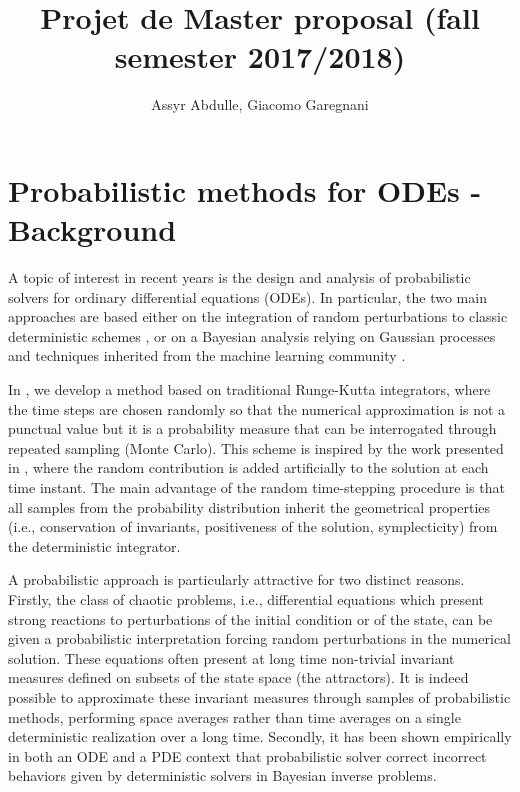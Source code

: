 \documentclass{siamart1116}
\title{Projet de Master proposal (fall semester 2017/2018)}
\author{Assyr Abdulle, Giacomo Garegnani}
\begin{document}
\maketitle
	
\section*{Probabilistic methods for ODEs - Background}
A topic of interest in recent years is the design and analysis of probabilistic solvers for ordinary differential equations (ODEs). In particular, the two main approaches are based either on the integration of random perturbations to classic deterministic schemes \cite{CGS16, AbG17}, or on a Bayesian analysis relying on Gaussian processes and techniques inherited from the machine learning community \cite{KeH16}. 

In \cite{AbG17}, we develop a method based on traditional Runge-Kutta integrators, where the time steps are chosen randomly so that the numerical approximation is not a punctual value but it is a probability measure that can be interrogated through repeated sampling (Monte Carlo). This scheme is inspired by the work presented in \cite{CGS16}, where the random contribution is added artificially to the solution at each time instant. The main advantage of the random time-stepping procedure is that all samples from the probability distribution inherit the geometrical properties (i.e., conservation of invariants, positiveness of the solution, symplecticity) from the deterministic integrator.

A probabilistic approach is particularly attractive for two distinct reasons. Firstly, the class of chaotic problems, i.e., differential equations which present strong reactions to perturbations of the initial condition or of the state, can be given a probabilistic interpretation forcing random perturbations in the numerical solution. These equations often present at long time non-trivial invariant measures defined on subsets of the state space (the attractors). It is indeed possible to approximate these invariant measures through samples of probabilistic methods, performing space averages rather than time averages on a single deterministic realization over a long time. Secondly, it has been shown empirically \cite{COS17, CGS16, AbG17} in both an ODE and a PDE context that probabilistic solver correct incorrect behaviors given by deterministic solvers in Bayesian inverse problems.
\end{document}
